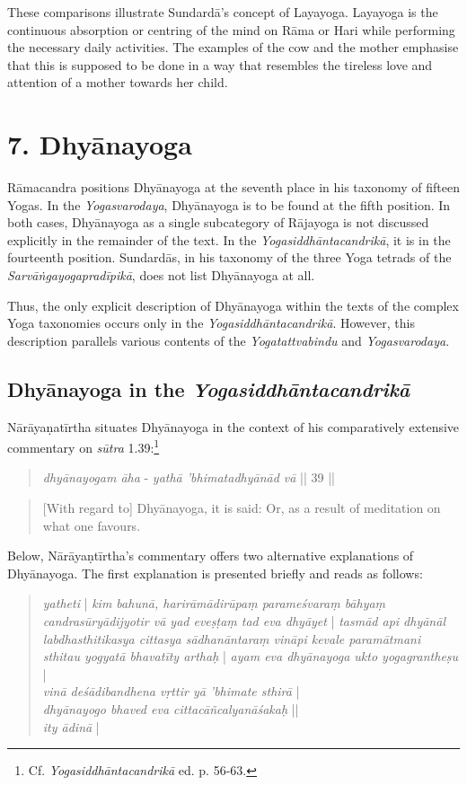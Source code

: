 These comparisons illustrate Sundardā's concept of Layayoga. Layayoga is the continuous absorption or centring of the mind on Rāma or Hari while performing the necessary daily activities. The examples of the cow and the mother emphasise that this is supposed to be done in a way that resembles the tireless love and attention of a mother towards her child.

\section{7. Dhyānayoga}
\label{dhyānayogaintro}

Rāmacandra positions Dhyānayoga at the seventh place in his taxonomy of fifteen Yogas. In the \textit{Yogasvarodaya}, Dhyānayoga is to be found at the fifth position. In both cases, Dhyānayoga as a single subcategory of Rājayoga is not discussed explicitly in the remainder of the text. In the \textit{Yogasiddhāntacandrikā}, it is in the fourteenth position. Sundardās, in his taxonomy of the three Yoga tetrads of the \textit{Sarvāṅgayogapradīpikā}, does not list Dhyānayoga at all.

Thus, the only explicit description of Dhyānayoga within the texts of the complex Yoga taxonomies occurs only in the \textit{Yogasiddhāntacandrikā}. However, this description parallels various contents of the \textit{Yogatattvabindu} and \textit{Yogasvarodaya}.   

\subsection{Dhyānayoga in the \textit{Yogasiddhāntacandrikā}}

Nārāyaṇatīrtha situates Dhyānayoga in the context of his comparatively extensive commentary on \textit{sūtra} 1.39:\footnote{Cf. \emph{Yogasiddhāntacandrikā} ed. p. 56-63.}

\begin{quote}
\textit{dhyānayogam āha} - 
\textit{yathā 'bhimatadhyānād vā} || 39 ||
\end{quote}
\begin{quote}
[With regard to] Dhyānayoga, it is said: 
 Or, as a result of meditation on what one favours.
\end{quote}

Below, Nārāyaṇtīrtha's commentary offers two alternative explanations of Dhyānayoga. The first explanation is presented briefly and reads as follows: 

\begin{quote}
  \textit{yatheti} | \textit{kim bahunā, harirāmādirūpaṃ parameśvaraṃ bāhyaṃ candrasūryādijyotir vā yad eveṣṭaṃ tad eva dhyāyet} | \textit{tasmād api dhyānāl labdhasthitikasya cittasya sādhanāntaraṃ vināpi kevale paramātmani sthitau yogyatā bhavatīty arthaḥ} | \textit{ayam eva dhyānayoga ukto yogagrantheṣu} |\\
  
  \textit{vinā deśādibandhena vṛttir yā 'bhimate sthirā} |\\
  \textit{dhyānayogo bhaved eva cittacāñcalyanāśakaḥ} ||\\
    \textit{ity ādinā} | 
\end{quote}

